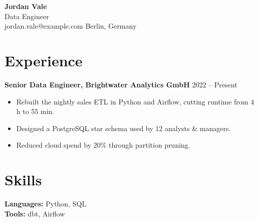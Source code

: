 \documentclass[11pt]{article}
\newcommand{\role}[2]{\textbf{#1} \hfill #2}
\begin{document}
\begin{center}
{\LARGE \textbf{Jordan Vale}} \\
Data Engineer \\
jordan.vale@example.com \quad Berlin, Germany
\end{center}

\section*{Experience}
\role{Senior Data Engineer, Brightwater Analytics GmbH}{2022 -- Present}
\begin{itemize}
  \item Rebuilt the nightly sales ETL in Python and Airflow, cutting runtime from 4 h to 55 min. %
  \item Designed a PostgreSQL star schema used by 12 analysts \& managers.
  \item Reduced cloud spend by 20\% through partition pruning.
\end{itemize}

\section*{Skills}
\textbf{Languages:} Python, SQL \\
\textbf{Tools:} dbt, Airflow
\end{document}

